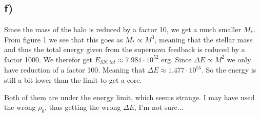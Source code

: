 \documentclass[a4paper,norsk, 10pt]{article}
\begin{document}
\subsection{f)}
Since the mass of the halo is reduced by a factor 10, we get a much smaller $M_{*}$. From figure 1 we see that this goes as $M_{*} \propto M^3$, meaning that the stellar mass and thus the total energy given from the supernova feedback is reduced by a factor 1000. We therefor get $E_{SN, tot} \approx 7.981 \cdot 10^{52}$ erg. Since $\Delta E \propto M^2$ we only have reduction of a factor 100. Meaning that $\Delta E \approx 1.477\cdot 10^{55}$. So the energy is still a bit lower than the limit to get a core. 

Both of them are under the energy limit, which seems strange. I may have used the wrong $\rho_0$, thus getting the wrong $\Delta E$, I'm not sure...
\end{document}
